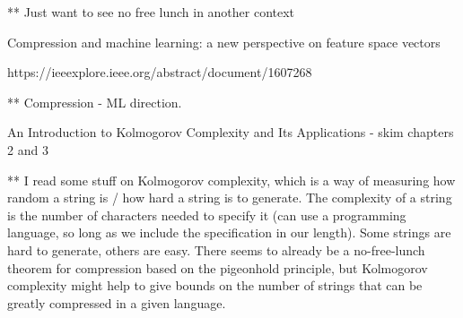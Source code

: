 \documentclass{article}
\begin{document}
** Just want to see no free lunch in another context

\bigskip

Compression and machine learning: a new perspective on feature space vectors

https://ieeexplore.ieee.org/abstract/document/1607268

** Compression - ML direction. 


\bigskip

An Introduction to Kolmogorov Complexity and Its Applications - skim chapters 2 and 3

** I read some stuff on Kolmogorov complexity, which is a way of measuring how random a string is / how hard a string is to generate. The complexity of a string is the number of characters needed to specify it (can use a programming language, so long as we include the specification in our length). Some strings are hard to generate, others are easy. There seems to already be a no-free-lunch theorem for compression based on the pigeonhold principle, but Kolmogorov complexity might help to give bounds on the number of strings that can be greatly compressed in a given language. 
\end{document}
